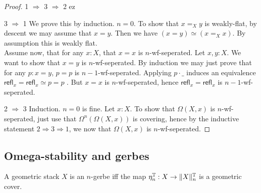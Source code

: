 \documentclass{article}
\newcommand{\refl}{\mathsf{refl}}
\begin{document}
\begin{proof}
	
	\item [1 $\Rightarrow$ 3 $\Rightarrow$ 2] ez

	\item [3 $\Rightarrow$ 1] We prove this by induction. $n = 0$. To show that $x =_{X} y$ is weakly-flat, by descent we may assume that $x = y$. Then we have $(x = y) \simeq (x =_{X} x)$. By assumption this is weakly flat. \\
	Assume now, that for any $x : X$, that $x = x$ is $n$-wf-seperated. Let $x, y : X$. We want to show that $x = y$ is $n$-wf-seperated. By induction we may just prove that for any $p : x = y$, $p = p$ is $n-1$-wf-seperated. Applying $p \cdot \_$ induces an equivalence $\refl_x = \refl_x \simeq p = p$ . But $x = x$ is $n$-wf-seperated, hence $\refl_x = \refl_x$ is $n-1$-wf-seperated.
	\item [2 $\Rightarrow$ 3] Induction. $n=0$ is fine. 
	Let $x : X$. To show that $\Omega(X,x)$ is $n$-wf-seperated, just use that $\Omega^n(\Omega(X,x))$ is covering, hence by the inductive statement $2 \Rightarrow 3 \Rightarrow 1$, we now that $\Omega(X,x)$ is $n$-wf-seperated.
\end{proof}
\subsection{Omega-stability and gerbes}
\begin{definition}
	A geometric stack $X$ is an $n$-gerbe iff the map $\eta_n^{\mathbb{T}} : X \to \|X\|_n^{\mathbb{T}}$ is a geometric cover.
\end{definition}
\end{document}
